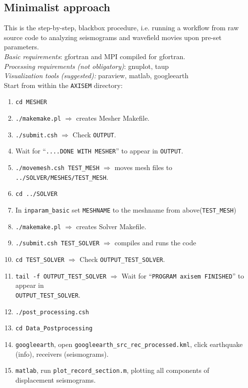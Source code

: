 \documentclass[11pt,letter,fleqn,english,notitlepage]{article}
\begin{document}
\subsection{Minimalist approach}
This is the step-by-step, blackbox procedure, i.e. running a workflow from raw source code to analyzing 
seismograms and wavefield movies upon pre-set parameters.\\

\noindent \textit{Basic requirements}: gfortran and MPI compiled for gfortran.\\
\textit{Processing requirements (not obligatory)}: gnuplot, taup\\
\textit{Visualization tools (suggested):} paraview, matlab, googleearth\\

\noindent Start from within the {\tt AXISEM} directory:
\begin{enumerate}
\item {\tt cd MESHER}
\item {\tt ./makemake.pl} $\Rightarrow$ creates Mesher Makefile.
\item {\tt ./submit.csh} $\Rightarrow$ Check {\tt OUTPUT}.
\item Wait for ``{\tt ....DONE WITH MESHER}'' to appear in {\tt OUTPUT}.
\item {\tt ./movemesh.csh TEST\_MESH} $\Rightarrow$ moves mesh files to {\tt ../SOLVER/MESHES/TEST\_MESH}.
\item {\tt cd ../SOLVER}
\item In \verb|inparam_basic| set \verb|MESHNAME| to the meshname from above(\verb|TEST_MESH|)
\item {\tt ./makemake.pl} $\Rightarrow$ creates Solver Makefile.
\item {\tt ./submit.csh TEST\_SOLVER}  $\Rightarrow$ compiles and runs the code
\item {\tt cd TEST\_SOLVER} $\Rightarrow$ Check {\tt OUTPUT\_TEST\_SOLVER}.
\item \verb|tail -f OUTPUT_TEST_SOLVER| $\Rightarrow$ Wait for ``{\tt  PROGRAM
        axisem FINISHED}'' to appear in \\ {\tt OUTPUT\_TEST\_SOLVER}.
\item {\tt ./post\_processing.csh}
\item {\tt cd Data\_Postprocessing} 
\item {\tt googleearth}, open {\tt googleearth\_src\_rec\_processed.kml}, click
        earthquake (info), receivers (seismograms).
\item {\tt matlab}, run {\tt plot\_record\_section.m}, plotting all components of displacement seismograms.

\end{enumerate}
\end{document}
